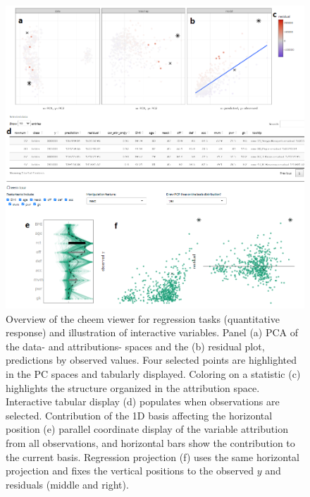 \documentclass[
]{jss}
\begin{document}
\begin{CodeChunk}
\begin{figure}

{\centering \includegraphics[width=1\linewidth]{./figures/app_regression_interactions} 

}

\caption[Overview of the cheem viewer for regression tasks (quantitative response) and illustration of interactive variables]{Overview of the cheem viewer for regression tasks (quantitative response) and illustration of interactive variables. Panel (a) PCA of the data- and attributions- spaces and the (b) residual plot, predictions by observed values. Four selected points are highlighted in the PC spaces and tabularly displayed. Coloring on a statistic (c) highlights the structure organized in the attribution space. Interactive tabular display (d) populates when observations are selected. Contribution of the 1D basis affecting the horizontal position (e) parallel coordinate display of the variable attribution from all observations, and horizontal bars show the contribution to the current basis. Regression projection (f) uses the same horizontal projection and fixes the vertical positions to the observed $y$ and residuals (middle and right).}\label{fig:regressioncase}
\end{figure}
\end{CodeChunk}
\end{document}

